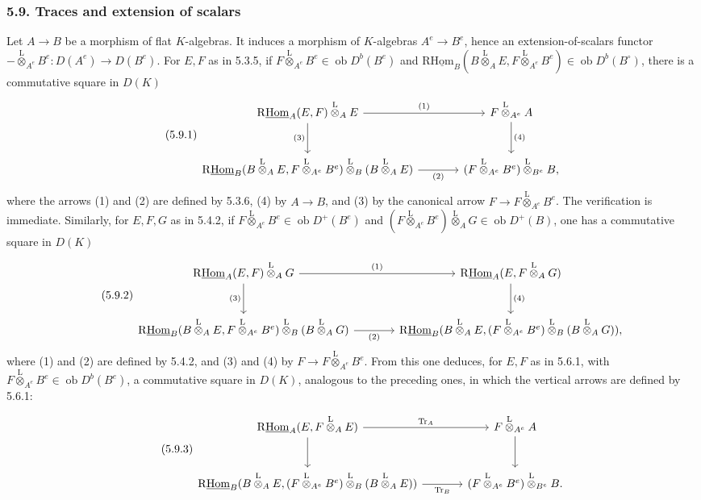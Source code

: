 \documentclass[11pt]{article}
\newcommand{\ob}{\operatorname{ob}}
\providecommand{\Tr}{\operatorname{Tr}}
\providecommand{\Tr}{\operatorname{Tr}}
\providecommand{\lten}{\overset{\mathrm L}{\otimes}}
\providecommand{\Tr}{\operatorname{Tr}}
\providecommand{\ob}{\operatorname{ob}}
\providecommand{\lten}{\overset{\mathrm L}{\otimes}}
\providecommand{\lten}{\overset{\mathrm L}{\otimes}}
\providecommand{\Tr}{\operatorname{Tr}}
\providecommand{\lten}{\overset{\mathrm L}{\otimes}}
\providecommand{\lten}{\overset{\mathrm L}{\otimes}}
\providecommand{\lten}{\overset{\mathrm L}{\otimes}}
\providecommand{\Tr}{\operatorname{Tr}}
\providecommand{\lten}{\overset{\mathrm L}{\otimes}}
\begin{document}
\subsubsection*{5.9. Traces and extension of scalars}

Let $A\to B$ be a morphism of flat $K$-algebras. It induces a morphism of $K$-algebras $A^e\to B^e$, hence an extension-of-scalars functor $-\lten_{A^e}B^e:D(A^e)\longrightarrow D(B^e)$.
For $E,F$ as in 5.3.5, if $F\lten_{A^e}B^e\in\ob D^b(B^e)$ and $\mathrm{R}\underline{\mathrm{Hom}}_B(B\lten_AE,F\lten_{A^e}B^e)\in\ob D^b(B^\circ)$, there is a commutative square in $D(K)$
\begin{equation}\tag{5.9.1}
\begin{tikzcd}[column sep=large,row sep=large]
\mathrm{R}\underline{\mathrm{Hom}}_A(E,F)\lten_AE \arrow[r,"(1)"] \arrow[d,"(3)"'] & F\lten_{A^e}A \arrow[d,"(4)"]\\
\mathrm{R}\underline{\mathrm{Hom}}_B(B\lten_AE,F\lten_{A^e}B^e)\lten_B(B\lten_AE) \arrow[r,"(2)"'] & (F\lten_{A^e}B^e)\lten_{B^e}B,
\end{tikzcd}
\end{equation}
where the arrows (1) and (2) are defined by 5.3.6, (4) by $A\to B$, and (3) by the canonical arrow $F\to F\lten_{A^e}B^e$. The verification is immediate. Similarly, for $E,F,G$ as in 5.4.2, if $F\lten_{A^e}B^e\in\ob D^+(B^e)$ and $(F\lten_{A^e}B^e)\lten_AG\in\ob D^+(B)$, one has a commutative square in $D(K)$
\begin{equation}\tag{5.9.2}
\begin{tikzcd}[column sep=large,row sep=large]
\mathrm{R}\underline{\mathrm{Hom}}_A(E,F)\lten_AG \arrow[r,"(1)"] \arrow[d,"(3)"'] & \mathrm{R}\underline{\mathrm{Hom}}_A(E,F\lten_AG) \arrow[d,"(4)"]\\
\mathrm{R}\underline{\mathrm{Hom}}_B(B\lten_AE,F\lten_{A^e}B^e)\lten_B(B\lten_AG) \arrow[r,"(2)"'] & \mathrm{R}\underline{\mathrm{Hom}}_B(B\lten_AE,(F\lten_{A^e}B^e)\lten_B(B\lten_AG)),
\end{tikzcd}
\end{equation}
where (1) and (2) are defined by 5.4.2, and (3) and (4) by $F\to F\lten_{A^e}B^e$. From this one deduces, for $E,F$ as in 5.6.1, with $F\lten_{A^e}B^e\in\ob D^b(B^e)$, a commutative square in $D(K)$, analogous to the preceding ones, in which the vertical arrows are defined by 5.6.1:
\begin{equation}\tag{5.9.3}
\begin{tikzcd}[column sep=large,row sep=large]
\mathrm{R}\underline{\mathrm{Hom}}_A(E,F\lten_AE) \arrow[r,"\Tr_A"] \arrow[d] & F\lten_{A^e}A \arrow[d]\\
\mathrm{R}\underline{\mathrm{Hom}}_B(B\lten_AE,(F\lten_{A^e}B^e)\lten_B(B\lten_AE)) \arrow[r,"\Tr_B"'] & (F\lten_{A^e}B^e)\lten_{B^e}B.
\end{tikzcd}
\end{equation}
\end{document}
